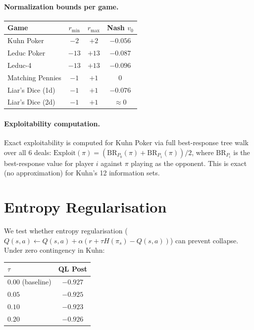 \documentclass{article}
\begin{document}
\paragraph{Normalization bounds per game.}
\begin{center}
\begin{tabular}{lccc}
\toprule
Game & $r_{\min}$ & $r_{\max}$ & Nash $v_0$ \\
\midrule
Kuhn Poker & $-2$ & $+2$ & $-0.056$ \\
Leduc Poker & $-13$ & $+13$ & $-0.087$ \\
Leduc-4 & $-13$ & $+13$ & $-0.096$ \\
Matching Pennies & $-1$ & $+1$ & $0$ \\
Liar's Dice (1d) & $-1$ & $+1$ & $-0.076$ \\
Liar's Dice (2d) & $-1$ & $+1$ & $\approx 0$ \\
\bottomrule
\end{tabular}
\end{center}

\paragraph{Exploitability computation.} Exact exploitability is computed for Kuhn Poker via full best-response tree walk over all 6 deals: $\text{Exploit}(\pi) = (\text{BR}_{P_0}(\pi) + \text{BR}_{P_1}(\pi)) / 2$, where $\text{BR}_{P_i}$ is the best-response value for player $i$ against $\pi$ playing as the opponent. This is exact (no approximation) for Kuhn's 12 information sets.

\section{Entropy Regularisation}
\label{app:entropy}
We test whether entropy regularisation ($Q(s,a) \leftarrow Q(s,a) + \alpha(r + \tau H(\pi_s) - Q(s,a))$) can prevent collapse. Under zero contingency in Kuhn:

\begin{center}
\begin{tabular}{lc}
\toprule
$\tau$ & QL Post \\
\midrule
$0.00$ (baseline) & $-0.927$ \\
$0.05$ & $-0.925$ \\
$0.10$ & $-0.923$ \\
$0.20$ & $-0.926$ \\
\bottomrule
\end{tabular}
\end{center}
\end{document}
